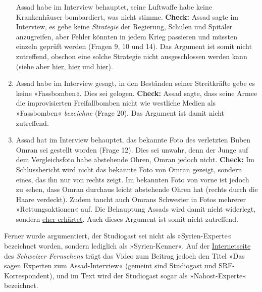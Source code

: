 \begin{enumerate}
  Assad habe im Interview behauptet, seine Luftwaffe habe keine
  Krankenhäuser bombardiert, was nicht stimme. \textbf{Check:} Assad
  sagte im Interview, es gebe keine \emph{Strategie} der Regierung,
  Schulen und Spitäler anzugreifen, aber Fehler könnten in jedem Krieg
  passieren und müssten einzeln geprüft werden (Fragen 9, 10 und 14).
  Das Argument ist somit nicht zutreffend, obschon eine solche Strategie
  nicht ausgeschlossen werden kann (siehe aber
  \href{http://www.globalresearch.ca/a-tale-of-two-hospitals-fabricated-bombing-incident-vs-open-terrorist-targeting-of-facilities-in-aleppo/5523687}{hier},
  \href{http://www.globalresearch.ca/the-aleppo-hospital-smokescreen-covering-up-al-qaeda-massacres-in-syria-once-again/5524250}{hier}
  und
  \href{http://www.globalresearch.ca/the-wests-silence-about-the-bombing-of-russias-hospital-in-aleppo-is-shameful/5560807}{hier}).
\item
  Assad habe im Interview gesagt, in den Beständen seiner Streitkräfte
  gebe es keine »Fassbomben«. Dies sei gelogen. \textbf{Check:} Assad
  sagte, dass seine Armee die improvisierten Freifallbomben nicht wie
  westliche Medien als »Fassbomben« \emph{bezeichne} (Frage 20). Das
  Argument ist damit nicht zutreffend.
\item
  Assad hat im Interview behauptet, das bekannte Foto des verletzten
  Buben Omran sei gestellt worden (Frage 12). Dies sei unwahr, denn der
  Junge auf dem Vergleichsfoto habe abstehende Ohren, Omran jedoch
  nicht. \textbf{Check:} Im Schlussbericht wird nicht das bekannte Foto
  von Omran gezeigt, sondern eines, das ihn nur von rechts zeigt. Im
  bekannten Foto von vorne ist jedoch zu sehen, dass Omran durchaus
  leicht abstehende Ohren hat (rechts durch die Haare verdeckt). Zudem
  taucht auch Omrans Schwester in Fotos mehrerer »Rettungsaktionen« auf.
  Die Behauptung Assads wird damit nicht widerlegt, sondern
  \href{http://www.moonofalabama.org/2016/10/assad-says-the-boy-in-the-ambulance-is-fake-we-show-why.html}{eher
  erhärtet}. Auch dieses Argument ist somit nicht zutreffend.
\end{enumerate}

Ferner wurde argumentiert, der Studiogast sei nicht als »Syrien-Experte«
bezeichnet worden, sondern lediglich als »Syrien-Kenner«. Auf der
\href{http://www.srf.ch/news/international/assad-ist-nur-noch-an-der-macht-weil-er-so-brutal-ist}{Internetseite}
des \emph{Schweizer Fernsehens} trägt das Video zum Beitrag jedoch den
Titel »Das sagen Experten zum Assad-Interview« (gemeint sind Studiogast
und SRF-Korrespondent), und im Text wird der Studiogast sogar als
»Nahost-Experte« bezeichnet.

